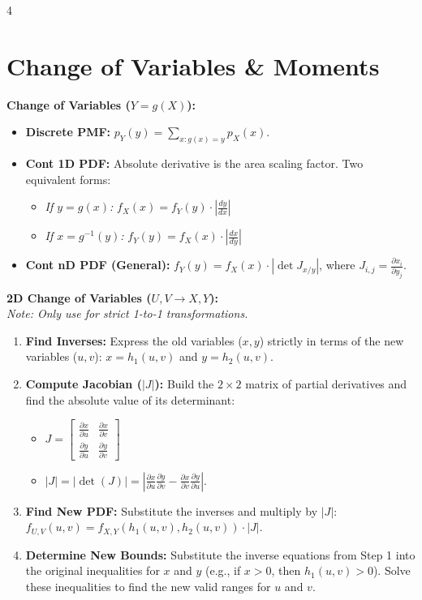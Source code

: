 \documentclass[9pt]{extarticle}
\begin{document}
\begin{multicols*}{4}
\section*{Change of Variables \& Moments}
\textbf{Change of Variables ($Y = g(X)$):}
\begin{itemize}
    \item \textbf{Discrete PMF:} $p_Y(y) = \sum_{x:g(x)=y} p_X(x)$.
    \item \textbf{Cont 1D PDF:} Absolute derivative is the area scaling factor. Two equivalent forms:
    \begin{itemize}
        \item \textit{If $y=g(x)$:} $f_X(x) = f_Y(y) \cdot \left| \frac{dy}{dx} \right|$
        \item \textit{If $x=g^{-1}(y)$:} $f_Y(y) = f_X(x) \cdot \left| \frac{dx}{dy} \right|$
    \end{itemize}
    \item \textbf{Cont nD PDF (General):} $f_Y(y) = f_X(x) \cdot |\det J_{x/y}|$, where $J_{i,j} = \frac{\partial x_i}{\partial y_j}$.
\end{itemize}

\textbf{2D Change of Variables ($U,V \to X,Y$):} \\
\textit{Note: Only use for strict 1-to-1 transformations.}
\begin{enumerate}
    \item \textbf{Find Inverses:} Express the old variables ($x, y$) strictly in terms of the new variables ($u, v$): $x = h_1(u,v)$ and $y = h_2(u,v)$.
    \item \textbf{Compute Jacobian ($|J|$):} Build the $2 \times 2$ matrix of partial derivatives and find the absolute value of its determinant:
    \begin{itemize}
        \item $J = \begin{bmatrix} \frac{\partial x}{\partial u} & \frac{\partial x}{\partial v} \\ \frac{\partial y}{\partial u} & \frac{\partial y}{\partial v} \end{bmatrix}$
        \item $|J| = |\det(J)| = \left| \frac{\partial x}{\partial u}\frac{\partial y}{\partial v} - \frac{\partial x}{\partial v}\frac{\partial y}{\partial u} \right|$.
    \end{itemize}
    \item \textbf{Find New PDF:} Substitute the inverses and multiply by $|J|$: \\
    $f_{U,V}(u,v) = f_{X,Y}(h_1(u,v), h_2(u,v)) \cdot |J|$.
    \item \textbf{Determine New Bounds:} Substitute the inverse equations from Step 1 into the original inequalities for $x$ and $y$ (e.g., if $x > 0$, then $h_1(u,v) > 0$). Solve these inequalities to find the new valid ranges for $u$ and $v$.
\end{enumerate}


\end{multicols*}
\end{document}
